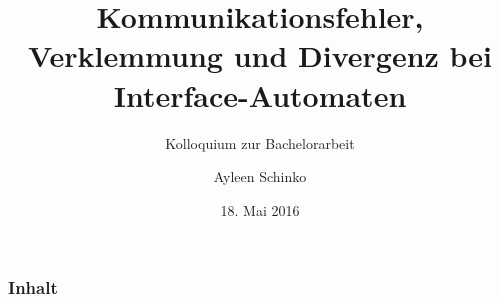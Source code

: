 \documentclass[mathserif, xcolor=dvipsnames, notheorems, compress, handout]{beamer}
\title{Kommunikationsfehler, Verklemmung und Divergenz bei Interface-Automaten}
\subtitle{Kolloquium zur Bachelorarbeit}
\author{Ayleen Schinko}
\date{18. Mai 2016}
\begin{document}
\begin{frame}[plain]
\maketitle
\end{frame}

\begin{frame}
  \frametitle{Inhalt}
  \tableofcontents{}
\end{frame}








\end{document}
